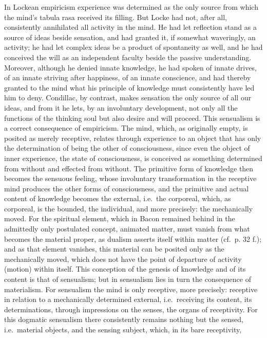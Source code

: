 In Lockean empiricism experience was determined as the only source from
which the mind's tabula rasa received its filling. But Locke had not,
after all, consistently annihilated all activity in the mind. He had let
reflection stand as a source of ideas beside sensation, and had granted
it, if somewhat waveringly, an activity; he had let complex
ideas be a product of spontaneity as well, and he had conceived the will
as an independent faculty beside the passive understanding. Moreover,
although he denied innate knowledge, he had spoken of innate drives, of
an innate striving after happiness, of an innate conscience, and had
thereby granted to the mind what his principle of knowledge must
consistently have led him to deny. Condillac, by contrast, makes
sensation the only source of all our ideas, and from it he lets, by an
involuntary development, not only all the functions of the thinking
soul but also desire and will proceed. This sensualism is a correct
consequence of empiricism. The mind, which, as originally empty, is
posited as merely receptive, relates through experience to an object
that has only the determination of being the other of consciousness,
since even the object of inner experience, the state of consciousness,
is conceived as something determined from without and effected from
without. The primitive form of knowledge then becomes the sensuous
feeling, whose involuntary transformation in the receptive mind
produces the other forms of consciousness, and the primitive and actual
content of knowledge becomes the external, i.e.\ the corporeal, which,
as corporeal, is the bounded, the individual, and more precisely: the
mechanically moved. For the spiritual element, which in Bacon remained
behind in the admittedly only postulated concept, animated matter, must
vanish from what becomes the material proper, as dualism asserts itself
within matter (cf.\ p. 32 f.); and as that element vanishes, this
material can be posited only as the mechanically moved, which does not
have the point of departure of activity (motion) within itself. This
conception of the genesis of knowledge and of its content is that of
sensualism; but in sensualism lies in turn the consequence of
materialism. For sensualism the mind is only receptive, more precisely:
receptive in relation to a mechanically determined external, i.e.\
receiving its content, its determinations, through impressions on the
senses, the organs of receptivity. For this dogmatic sensualism there
consistently re\opage{60}mains nothing but the sensed, i.e.\ material
objects, and the sensing subject, which, in its bare receptivity,
